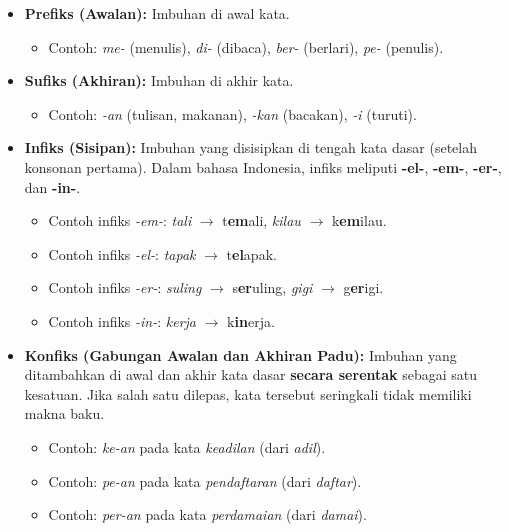 \documentclass[12pt, a4paper]{article}
\begin{document}
\begin{itemize}
    \item \textbf{Prefiks (Awalan):} Imbuhan di awal kata.
        \begin{itemize}
            \item Contoh: \textit{me-} (menulis), \textit{di-} (dibaca), \textit{ber-} (berlari), \textit{pe-} (penulis).
        \end{itemize}
    \item \textbf{Sufiks (Akhiran):} Imbuhan di akhir kata.
        \begin{itemize}
            \item Contoh: \textit{-an} (tulisan, makanan), \textit{-kan} (bacakan), \textit{-i} (turuti).
        \end{itemize}
    \item \textbf{Infiks (Sisipan):} Imbuhan yang disisipkan di tengah kata dasar (setelah konsonan pertama). Dalam bahasa Indonesia, infiks meliputi \textbf{-el-}, \textbf{-em-}, \textbf{-er-}, dan \textbf{-in-}.
        \begin{itemize}
            \item Contoh infiks \textit{-em-}: \textit{tali} $\rightarrow$ t\textbf{em}ali, \textit{kilau} $\rightarrow$ k\textbf{em}ilau.
            \item Contoh infiks \textit{-el-}: \textit{tapak} $\rightarrow$ t\textbf{el}apak.
            \item Contoh infiks \textit{-er-}: \textit{suling} $\rightarrow$ s\textbf{er}uling, \textit{gigi} $\rightarrow$ g\textbf{er}igi.
            \item Contoh infiks \textit{-in-}: \textit{kerja} $\rightarrow$ k\textbf{in}erja.
        \end{itemize}
    \item \textbf{Konfiks (Gabungan Awalan dan Akhiran Padu):} Imbuhan yang ditambahkan di awal dan akhir kata dasar \textbf{secara serentak} sebagai satu kesatuan. Jika salah satu dilepas, kata tersebut seringkali tidak memiliki makna baku.
        \begin{itemize}
            \item Contoh: \textit{ke-an} pada kata \textit{keadilan} (dari \textit{adil}).
            \item Contoh: \textit{pe-an} pada kata \textit{pendaftaran} (dari \textit{daftar}).
            \item Contoh: \textit{per-an} pada kata \textit{perdamaian} (dari \textit{damai}).
        \end{itemize}
\end{itemize}
\end{document}
